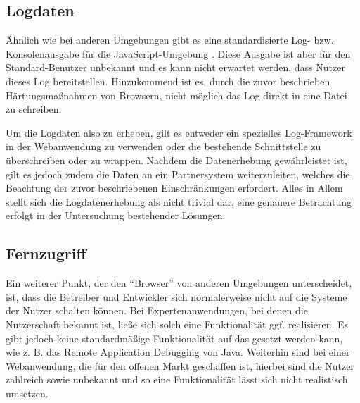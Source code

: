 \subsection{Logdaten}
\label{sec:logdaten}

Ähnlich wie bei anderen Umgebungen gibt es eine standardisierte Log- bzw. Konsolenausgabe für die JavaScript-Umgebung \cite{MDNConsole}. Diese Ausgabe ist aber für den Standard-Benutzer unbekannt und es kann nicht erwartet werden, dass Nutzer dieses Log bereitstellen. Hinzukommend ist es, durch die zuvor beschrieben Härtungsmaßnahmen von Browsern, nicht möglich das Log direkt in eine Datei zu schreiben.

Um die Logdaten also zu erheben, gilt es entweder ein spezielles Log-Framework in der Webanwendung zu verwenden oder die bestehende Schnittstelle zu überschreiben oder zu wrappen. Nachdem die Datenerhebung gewährleistet ist, gilt es jedoch zudem die Daten an ein Partnersystem weiterzuleiten, welches die Beachtung der zuvor beschriebenen Einschränkungen erfordert. Alles in Allem stellt sich die Logdatenerhebung als nicht trivial dar, eine genauere Betrachtung erfolgt in der Untersuchung bestehender Lösungen.

\subsection{Fernzugriff}

Ein weiterer Punkt, der den \enquote{Browser} von anderen Umgebungen unterscheidet, ist, dass die Betreiber und Entwickler sich normalerweise nicht auf die Systeme der Nutzer schalten können. Bei Expertenanwendungen, bei denen die Nutzerschaft bekannt ist, ließe sich solch eine Funktionalität ggf. realisieren. Es gibt jedoch keine standardmäßige Funktionalität auf das gesetzt werden kann, wie z. B. das Remote Application Debugging \cite{JavaDebugWireProtocol} von Java. Weiterhin sind bei einer Webanwendung, die für den offenen Markt geschaffen ist, hierbei sind die Nutzer zahlreich sowie unbekannt und so eine Funktionalität lässt sich nicht realistisch umsetzen.